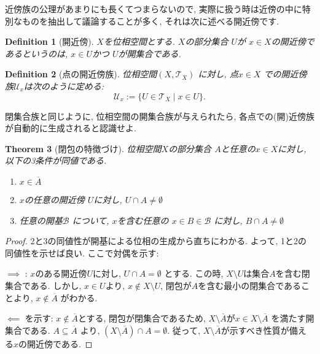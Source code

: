 \documentclass[dvipdfmx]{jbook}
\newcommand{\cl}[1]{\overline{ #1}  }
\newtheorem{theorem}{Theorem}[section]
\newtheorem{definition}[theorem]{Definition}
\theoremstyle{remark}
\theoremstyle{plain}
\begin{document}
近傍族の公理があまりにも長くてつまらないので, 実際に扱う時は近傍の中に特別なものを抽出して議論することが多く, それは次に述べる開近傍です.





\begin{definition}[開近傍]
	$X$を位相空間とする. $X$の部分集合 $U$が $x \in X$の開近傍であるというのは,  $ x \in U$かつ $U$が開集合である.
\end{definition}

\begin{definition}[点の開近傍族]
	位相空間$\left( X, \mathcal{T}_X \right) $ に対し, 点$x \in X$ での開近傍族$\mathcal{U}_x$は次のように定める:
	\[
	\mathcal{U}_x := \{U \in \mathcal{T}_X \mid x \in U\} 
	.\] 
\end{definition}


閉集合族と同じように, 位相空間の開集合族が与えられたら, 各点での(開)近傍族が自動的に生成されると認識せよ.

\begin{theorem}[閉包の特徴づけ]
	位相空間$X$の部分集合 $A$と任意の$x \in X$に対し, 以下の3条件が同値である.
	 \begin{enumerate}
		\item $x \in \cl{A}$
		\item  $x$の任意の開近傍 $U$に対し,  $U\cap A \neq \emptyset$
		\item  任意の開基$\mathcal{B}$ について, $x$を含む任意の $ x \in B \in \mathcal{B}$ に対し, $B\cap A \neq \emptyset$
	\end{enumerate}
\end{theorem}


\begin{proof}
	2と3の同値性が開基による位相の生成から直ちにわかる. よって, 1と2の同値性を示せば良い.
ここで対偶を示す:

$\implies$ : $x$のある開近傍$U$に対し,  $U \cap A = \emptyset$ とする. 
この時,  $X \setminus U$は集合$A$を含む閉集合である. 
しかし,  $x \in U $より, $x \not\in X \setminus U$, 閉包が$A$を含む最小の閉集合であることより, $x \not\in \cl{A}$ がわかる.

$\impliedby$ を示す: $x \not\in \cl{A} $とする, 閉包が閉集合であるため, $X \setminus \cl{A}$が$x \in X \setminus \cl{A}$ を満たす開集合である. 
$A \subseteq \cl{A}$ より, $\left( X\setminus \cl{A} \right) \cap A = \emptyset$. 
従って, $X \setminus \cl{A}$が示すべき性質が備える$x$の開近傍である.
	
\end{proof}
\end{document}
